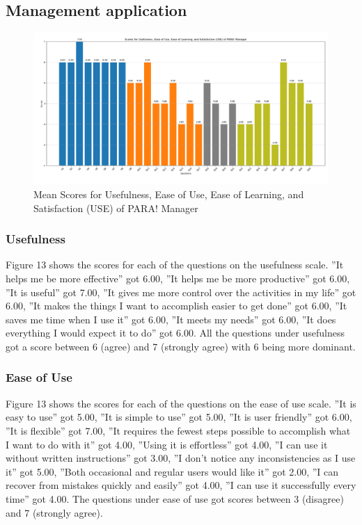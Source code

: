 \documentclass[journal]{./IEEE/IEEEtran}
\begin{document}
\subsection{Management application}
\begin{figure}[h]
    \centering
        \includegraphics[scale=0.18]{./figures/manager means.png}
    \caption{Mean Scores for Usefulness, Ease of Use, Ease of Learning, and Satisfaction (USE) of PARA! Manager}
\end{figure}
\subsubsection{Usefulness}
Figure 13 shows the scores for each of the questions on the usefulness scale.
”It helps me be more effective” got 6.00, ”It helps me be more productive” got 6.00, ”It is useful” got 7.00, ”It gives me more control over the activities in my life” got 6.00, ”It makes the things I want to accomplish easier to get done” got 6.00, ”It saves me time when I use it” got 6.00, ”It meets my needs” got 6.00, ”It does everything I would expect it to do” got 6.00.
All the questions under usefulness got a score between 6 (agree) and 7 (strongly agree) with 6 being more dominant.
\subsubsection{Ease of Use}
Figure 13 shows the scores for each of the questions on the ease of use scale. ”It is easy to use” got 5.00, ”It is simple to use” got 5.00, ”It is user friendly” got 6.00, ”It is flexible” got 7.00, ”It requires the fewest steps possible to accomplish what I want to do with it” got 4.00, ”Using it is effortless” got 4.00, ”I can use it without written instructions” got 3.00, ”I don’t notice any inconsistencies as I use it” got 5.00, ”Both occasional and regular users would like it” got 2.00, ”I can recover from mistakes quickly and easily” got 4.00, ”I can use it successfully every time” got 4.00.
The questions under ease of use got scores between 3 (disagree) and 7 (strongly agree).
\end{document}
